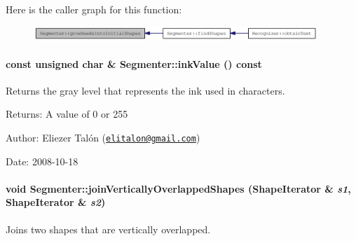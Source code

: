 Here is the caller graph for this function:\nopagebreak
\begin{figure}[H]
\begin{center}
\leavevmode
\includegraphics[width=304pt]{class_segmenter_72c007e345fad7abbf6e9d4edb615a50_icgraph}
\end{center}
\end{figure}
\hypertarget{class_segmenter_e9bc56ddcbe5ea4abb40fcc85e3d9fbe}{
\paragraph[{inkValue}]{\setlength{\rightskip}{0pt plus 5cm}const unsigned char \& Segmenter::inkValue () const}\hfill}
\label{class_segmenter_e9bc56ddcbe5ea4abb40fcc85e3d9fbe}


Returns the gray level that represents the ink used in characters. 

\begin{Desc}
\item[Returns:]A value of 0 or 255\end{Desc}
\begin{Desc}
\item[Author:]Eliezer Talón (\href{mailto:elitalon@gmail.com}{\tt elitalon@gmail.com}) \end{Desc}
\begin{Desc}
\item[Date:]2008-10-18 \end{Desc}
\hypertarget{class_segmenter_a6fc98922155143cf36f542118c33f3a}{
\paragraph[{joinVerticallyOverlappedShapes}]{\setlength{\rightskip}{0pt plus 5cm}void Segmenter::joinVerticallyOverlappedShapes ({\bf ShapeIterator} \& {\em s1}, \/  {\bf ShapeIterator} \& {\em s2})}\hfill}
\label{class_segmenter_a6fc98922155143cf36f542118c33f3a}


Joins two shapes that are vertically overlapped. 

